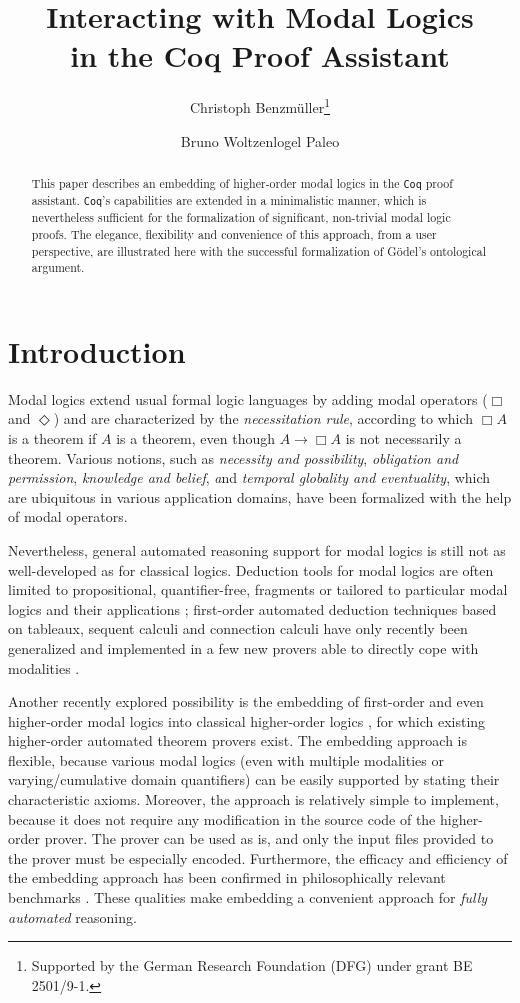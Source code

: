 \documentclass{llncs}
\title{
Interacting with Modal Logics \\
in the Coq Proof Assistant
}
\author{
  Christoph Benzm\"{u}ller\inst{1}\thanks{Supported by the German Research Foundation (DFG) under grant BE 2501/9-1.} 
  \and 
  Bruno Woltzenlogel Paleo\inst{2}
}
\institute{
  Freie Universit\"{a}t Berlin, Germany,  %
  \email{c.benzmueller@fu-berlin.de}
  \and 
  Vienna University of Technology, Austria, %
   \email{bruno@logic.at}
}
\newcommand{\imp}{\rightarrow}
\newcommand{\Coq}{\texttt{Coq}\xspace}
\begin{document}
\maketitle

\begin{abstract}  
  This paper describes an embedding of higher-order modal logics in
  the \Coq proof assistant. {\Coq}'s capabilities are extended in a
  minimalistic manner, which is nevertheless sufficient for the
  formalization of significant, non-trivial modal logic proofs. The
  elegance, flexibility and convenience of this approach, from a user
  perspective, are illustrated here with the successful formalization
  of G\"odel's ontological argument.
\end{abstract}



\section{Introduction}

Modal logics \cite{ModalLogic} extend usual formal logic languages by adding modal
operators ($\Box$ and $\Diamond$) and are characterized by the
\emph{necessitation rule}, according to which $\Box A$ is a theorem if
$A$ is a theorem, even though $A \imp \Box A$ is not necessarily a
theorem. Various notions, such as \emph{necessity and
possibility}, \emph{obligation and permission}, 
\emph{knowledge and belief}, \emph and \emph{temporal
globality and eventuality}, which are ubiquitous in various application domains,
have been formalized with the help of modal operators.

Nevertheless, general automated reasoning support for modal logics is still
not as well-developed as for classical logics. Deduction tools
for modal logics are often limited to propositional, quantifier-free,
fragments \cite{CoLoSS1,CoLoSS2,ConditionalTableaux,COOL,ModalProvers} or tailored to particular
modal logics and their applications \cite{ToDo:StephanMerz}; 
first-order automated deduction techniques based on tableaux, sequent
calculi and connection calculi have only recently been generalized 
and implemented in a few new provers able to directly cope with
modalities \cite{JensOtten}.

Another recently explored possibility is the embedding of first-order
and even higher-order modal logics into classical higher-order logics
\cite{J23,B9,J22}, for which existing higher-order automated theorem
provers \cite{LEO-II,Satallax} exist. The embedding approach is
flexible, because various modal logics (even with multiple modalities
or varying/cumulative domain quantifiers) can be easily supported by
stating their characteristic axioms. Moreover, the approach is
relatively simple to implement, because it does not require any
modification in the source code of the higher-order prover. The prover
can be used as is, and only the input files provided to the prover
must be especially encoded. Furthermore, the efficacy and efficiency
of the embedding approach has been confirmed in philosophically
relevant benchmarks \cite{FormalTheologyRepository}. These qualities
make embedding a convenient approach for \emph{fully automated}
reasoning.
\end{document}
